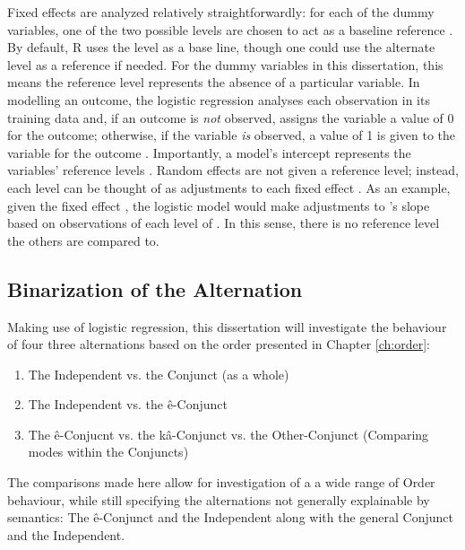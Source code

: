 Fixed effects are analyzed relatively straightforwardly: for each of the dummy variables, one of the two possible levels are chosen to act as a baseline reference \citep{baayen2012mixed}. By default, R uses the  level as a base line, though one could use the alternate level as a reference if needed. For the dummy variables in this dissertation, this means the reference level represents the absence of a particular variable. In modelling an outcome, the logistic regression analyses each observation in its training data and, if an outcome is \textit{not} observed, assigns the variable a value of 0 for the outcome; otherwise, if the variable \textit{is} observed, a value of 1 is given to the variable for the outcome \cite{baayen2012mixed}. Importantly, a model's intercept represents the variables' reference levels \citep{baayen2012mixed}. Random effects are not given a reference level; instead, each level can be thought of as adjustments to each fixed effect \citep{baayen2012mixed}. As an example, given the fixed effect , the logistic model would make adjustments to 's slope based on observations of each level of . In this sense, there is no reference level the others are compared to. 



\subsection{Binarization of the Alternation}
Making use of logistic regression, this dissertation will investigate the behaviour of four three alternations based on the order presented in Chapter \ref{ch:order}:
\begin{enumerate}
    \item The Independent vs. the Conjunct (as a whole)
    \item The Independent vs. the ê-Conjunct
    \item The ê-Conjucnt vs. the kâ-Conjunct vs. the Other-Conjunct (Comparing modes within the Conjuncts)

\end{enumerate}

The comparisons made here allow for investigation of a a wide range of Order behaviour, while still specifying the alternations not generally explainable by semantics: The ê-Conjunct and the Independent along with the general Conjunct and the Independent. 

